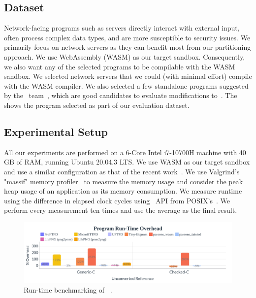 \subsection{Dataset}

Network-facing programs such as servers directly interact with external input, often process complex data types, and are more susceptible to security issues.
We primarily focus on network servers as they can benefit most from our partitioning approach.
We use WebAssembly (WASM) as our target sandbox. Consequently, we also want any of the selected programs to be compilable with the WASM sandbox.
We selected network servers that we could (with minimal effort) compile with the WASM compiler.
We also selected a few standalone programs suggested by the ~\checkedc team~\cite{benchmarkcc}, which are good candidates to evaluate modifications to~\checkedc.
The~ shows the program selected as part of our evaluation dataset.

\subsection{Experimental Setup}
All our experiments are performed on a 6-Core Intel i7-10700H machine with 40 GB of RAM, running Ubuntu 20.04.3 LTS.
We use WASM as our target sandbox and use a similar configuration as that of the recent work~\cite{rlbox-paper}.
We use Valgrind's "massif" memory profiler~\cite{seward2008valgrind} to measure the memory usage and consider the peak heap usage of an application as its memory consumption.
We measure runtime using the difference in elapsed clock cycles using~ API from POSIX's~.
We perform every measurement ten times and use the average as the final result.

\begin{figure}[t]
\includegraphics[width=1.0\linewidth]{images/program_runtime_benchmark.png}
\caption{Run-time benchmarking of ~\systemname.}
\label{fig:runtime}
\end{figure}

